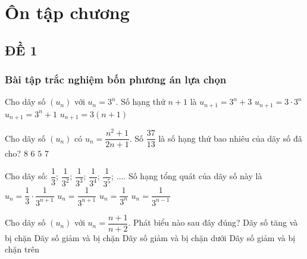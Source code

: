 \section{Ôn tập chương}
\setcounter{section}{0}
\setcounter{subsubsection}{0}
\setcounter{ex}{0}
\setcounter{bt}{0}

\subsection{ĐỀ 1}
\subsubsection{Bài tập trắc nghiệm bốn phương án lựa chọn}
\begin{ex}%
	Cho dãy số $(u_n)$ với $u_n=3^n$. Số hạng thứ $n+1$ là
	\choice
	{$u_{n+1}=3^n+3$}
	{\True $u_{n+1}=3\cdot 3^n$}
	{$u_{n+1}=3^n+1$}
	{$u_{n+1}=3(n+1)$}
\end{ex}
\begin{ex}%
	Cho dãy số $(u_n)$ có $u_n=\dfrac{n^2+1}{2n+1}$. Số $\dfrac{37}{13}$ là số hạng thứ bao nhiêu của dãy số đã cho?
	\choice
	{$8$}
	{\True $6$}
	{$5$}
	{$7$}
\end{ex}
\begin{ex}%
	Cho dãy số: $\dfrac{1}{3}$; $\dfrac{1}{3^2}$; $\dfrac{1}{3^3}$; $\dfrac{1}{3^4}$; $\dfrac{1}{3^5}$; $\ldots$. Số hạng tổng quát của dãy số này là
	\choice
	{$u_n=\dfrac{1}{3}\cdot \dfrac{1}{3^{n+1}}$}
	{$u_n=\dfrac{1}{3^{n+1}}$}
	{\True $u_n=\dfrac{1}{3^n}$}
	{$u_n=\dfrac{1}{3^{n-1}}$}
\end{ex}
\begin{ex}%
	Cho dãy số $(u_n)$ với $u_n=\dfrac{n+1}{n+2}$. Phát biểu nào sau đây đúng?
	\choice
	{\True Dãy số tăng và bị chặn}
	{Dãy số giảm và bị chặn}
	{Dãy số giảm và bị chặn dưới}
	{Dãy số giảm và bị chặn trên}
\end{ex}
